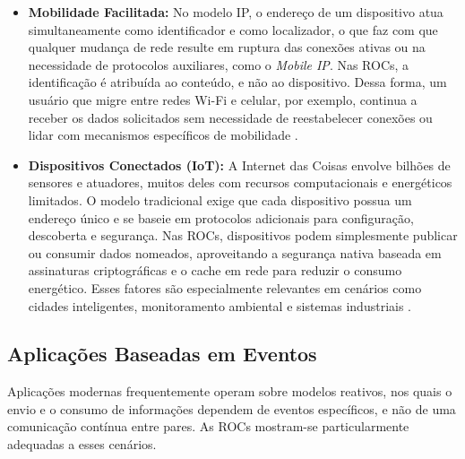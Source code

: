 \documentclass[12pt]{article}
\begin{document}
\begin{itemize}

\item \textbf{Mobilidade Facilitada:}
No modelo IP, o endereço de um dispositivo atua simultaneamente como identificador e como localizador, o que faz com que qualquer mudança de rede resulte em ruptura das conexões ativas ou na necessidade de protocolos auxiliares, como o \textit{Mobile IP}. Nas ROCs, a identificação é atribuída ao conteúdo, e não ao dispositivo. Dessa forma, um usuário que migre entre redes Wi-Fi e celular, por exemplo, continua a receber os dados solicitados sem necessidade de reestabelecer conexões ou lidar com mecanismos específicos de mobilidade \cite{ahlgren2012survey}.

\item \textbf{Dispositivos Conectados (IoT):}
A Internet das Coisas envolve bilhões de sensores e atuadores, muitos deles com recursos computacionais e energéticos limitados. O modelo tradicional exige que cada dispositivo possua um endereço único e se baseie em protocolos adicionais para configuração, descoberta e segurança. Nas ROCs, dispositivos podem simplesmente publicar ou consumir dados nomeados, aproveitando a segurança nativa baseada em assinaturas criptográficas e o cache em rede para reduzir o consumo energético. Esses fatores são especialmente relevantes em cenários como cidades inteligentes, monitoramento ambiental e sistemas industriais \cite{bvm12}.

\end{itemize}

\subsection{Aplicações Baseadas em Eventos}

Aplicações modernas frequentemente operam sobre modelos reativos, nos quais o envio e o consumo de informações dependem de eventos específicos, e não de uma comunicação contínua entre pares. As ROCs mostram-se particularmente adequadas a esses cenários.
\end{document}
